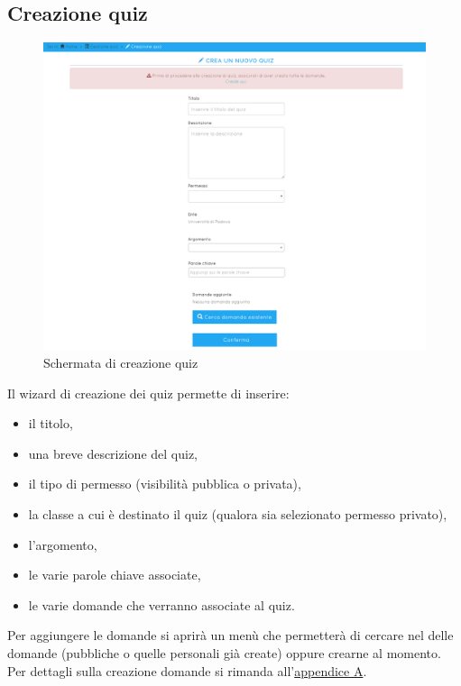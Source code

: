 \documentclass[a4paper, titlepage]{article}
\begin{document}
	 \newpage
	 \subsection{Creazione quiz}
	 \begin{figure}[!h]
	 	\centering
	 	\includegraphics[scale=0.33]{Img/screen_CreazioneQuiz.png}
	 	\caption{Schermata di creazione quiz}
	 \end{figure}
	 Il wizard di creazione dei quiz permette di inserire:
	 \begin{itemize}
	 	\item il titolo,
	 	\item una breve descrizione del quiz,
	 	\item il tipo di permesso (visibilità pubblica o privata),
	 	\item la classe a cui è destinato il quiz (qualora sia selezionato permesso privato),
	 	\item l'argomento,
	 	\item le varie parole chiave associate,
	 	\item le varie domande che verranno associate al quiz.
	 \end{itemize}
	 Per aggiungere le domande si aprirà un menù che permetterà di cercare nel  delle domande (pubbliche o quelle personali già create) oppure crearne al momento. Per dettagli sulla creazione domande si rimanda all'\hyperref[domande]{appendice A}.
	 
	 \newpage
\end{document}
